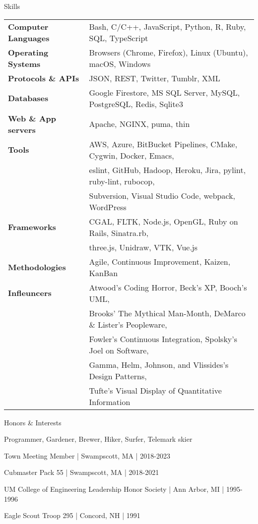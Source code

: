 \documentclass{resume}
\begin{document}
\begin{rSection}{Skills}
\begin{tabular}{ @{} >{\bfseries}l @{\hspace{6ex}} l }
Computer Languages & Bash, C/C++, JavaScript, Python, R, Ruby, SQL, TypeScript \\
Operating Systems & Browsers (Chrome, Firefox), Linux (Ubuntu), macOS, Windows \\
Protocols \& APIs & JSON, REST, Twitter, Tumblr, XML \\
Databases & Google Firestore, MS SQL Server, MySQL, PostgreSQL, Redis, Sqlite3 \\
Web \& App servers & Apache, NGINX, puma, thin \\
Tools & AWS, Azure, BitBucket Pipelines, CMake, Cygwin, Docker, Emacs, \\
 & eslint, GitHub, Hadoop, Heroku, Jira, pylint, ruby-lint, rubocop, \\
 & Subversion, Visual Studio Code, webpack, WordPress \\
Frameworks & CGAL, FLTK, Node.js, OpenGL, Ruby on Rails, Sinatra.rb, \\
 & three.js, Unidraw, VTK, Vue.js \\
Methodologies & Agile, Continuous Improvement, Kaizen, KanBan \\
Infleuncers & Atwood's Coding Horror, Beck's XP, Booch's UML, \\
 & Brooks' The Mythical Man-Month, DeMarco \& Lister's Peopleware, \\
 & Fowler's Continuous Integration, Spolsky's Joel on Software, \\
 & Gamma, Helm, Johnson, and Vlissides's Design Patterns, \\
 & Tufte's Visual Display of Quantitative Information
\end{tabular}
\end{rSection}

\begin{rSection}{Honors \& Interests}
\item Programmer, Gardener, Brewer, Hiker, Surfer, Telemark skier
\item Town Meeting Member | Swampscott, MA | 2018-2023
\item Cubmaster Pack 55 | Swampscott, MA | 2018-2021
\item UM College of Engineering Leadership Honor Society | Ann Arbor, MI | 1995-1996
\item Eagle Scout Troop 295 | Concord, NH | 1991
\end{rSection}
\end{document}
